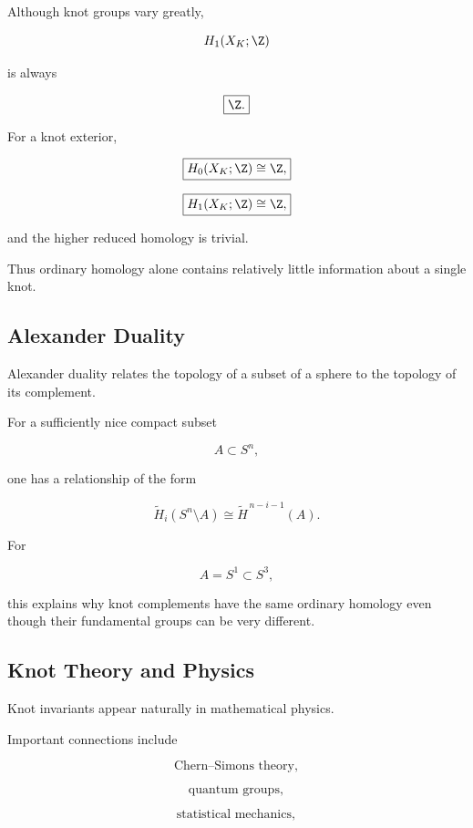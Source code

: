 Although knot groups vary greatly,

\[
H_1(X_K;\Z)
\]

is always

\[
\boxed{
\Z.
}
\]

For a knot exterior,

\[
\boxed{
H_0(X_K;\Z)\cong\Z,
}
\]

\[
\boxed{
H_1(X_K;\Z)\cong\Z,
}
\]

and the higher reduced homology is trivial.

Thus ordinary homology alone contains relatively little information about a
single knot.

\subsection{Alexander Duality}
\label{subsec:knots-alexander-duality}

Alexander duality relates the topology of a subset of a sphere to the
topology of its complement.

For a sufficiently nice compact subset

\[
A\subset S^n,
\]

one has a relationship of the form

\[
\boxed{
\widetilde{H}_i(S^n\setminus A)
\cong
\widetilde{H}^{\,n-i-1}(A).
}
\]

For

\[
A=S^1\subset S^3,
\]

this explains why knot complements have the same ordinary homology even
though their fundamental groups can be very different.

\subsection{Knot Theory and Physics}
\label{subsec:knot-theory-physics}

Knot invariants appear naturally in mathematical physics.

Important connections include

\[
\boxed{
\text{Chern--Simons theory},
}
\]

\[
\boxed{
\text{quantum groups},
}
\]

\[
\boxed{
\text{statistical mechanics},
}
\]

